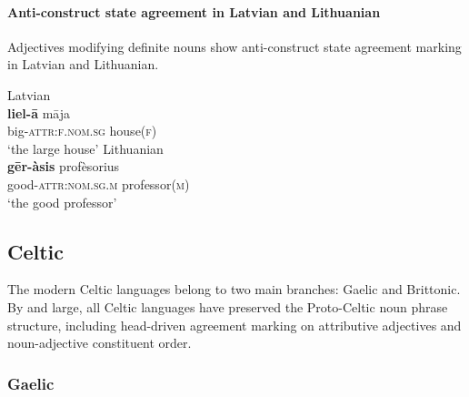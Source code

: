 \paragraph*{Anti\hyp{}construct state agreement in Latvian and Lithuanian}
Adjectives modifying definite nouns show anti\hyp{}construct state agreement marking in Latvian and Lithuanian.
\begin{exe}
\ex 
\begin{xlist}	
\ex \rm{Latvian \citep[example from][122]{dahl2015a}}\\
\gll 	\textbf{liel-ā} māja\\
	big-\textsc{attr:f.nom.sg} house(\textsc{f})\\
\glt	‘the large house’
\ex \rm{Lithuanian \citep[13]{bechert1993}}\\
\gll 	\textbf{gēr-àsis}		profèsorius\\
	good-\textsc{attr:nom.sg.m}	professor(\textsc{m})\\
\glt	‘the good professor’
\end{xlist}
\end{exe}

\subsection{Celtic}
The modern Celtic languages belong to two main branches: Gaelic and Brittonic. By and large, all Celtic languages have preserved the Proto\hyp{}Celtic noun phrase structure, including head\hyp{}driven agreement marking on attributive adjectives and noun-adjective constituent order.

\subsubsection{Gaelic}
